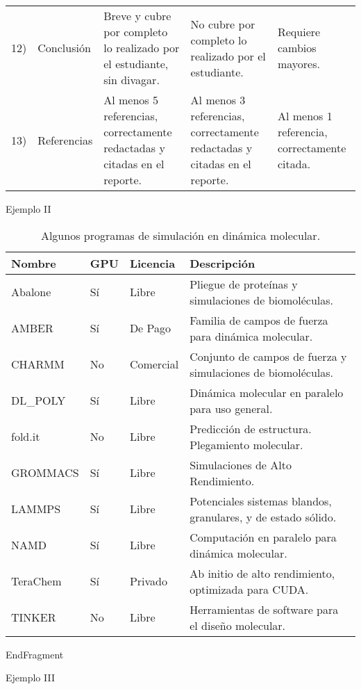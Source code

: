 \begin{table}[H]
{\begin{tabular}{rm{1.85cm}m{5cm}m{4cm}m{3.6cm}}
		12)   & Conclusión & Breve y cubre por completo lo realizado por el estudiante, sin divagar. & No cubre por completo lo realizado por el estudiante. & Requiere cambios mayores. \\ \cline{3-5}
		13)   & Referencias & Al menos 5 referencias, correctamente redactadas y citadas en el reporte. & Al menos 3 referencias, correctamente redactadas y citadas en el reporte.  & Al menos 1 referencia, correctamente citada.  \\ \cline{3-5}
		\hline
		\end{tabular}
	}
	\label{tab:Rubrica}
\end{table}

Ejemplo II

\begin{table}[H]\centering
  \begin{tabularx}{\textwidth}{XXXm{6.0cm}}\toprule
    Nombre & GPU  & Licencia & Descripción		\\		\midrule\midrule
    Abalone & Sí & Libre & Pliegue de proteínas y simulaciones de biomoléculas. \\
    AMBER & Sí & De Pago & Familia de campos de fuerza para dinámica molecular. \\
    CHARMM & No & Comercial & Conjunto de campos de fuerza y simulaciones de biomoléculas. \\
    DL\_POLY & Sí & Libre & Dinámica molecular en paralelo para uso general. \\
    fold.it & No & Libre & Predicción de estructura. Plegamiento molecular. \\
    GROMMACS & Sí & Libre & Simulaciones de Alto Rendimiento. \\ 
    LAMMPS & Sí & Libre & Potenciales sistemas blandos, granulares, y de estado sólido. \\
    NAMD & Sí & Libre & Computación en paralelo para dinámica molecular. \\
    TeraChem & Sí & Privado & Ab initio de alto rendimiento, optimizada para CUDA. \\
    TINKER & No & Libre & Herramientas de software para el diseño molecular. \\		\bottomrule
  \end{tabularx}
  \caption{Algunos programas de simulación en dinámica molecular.}\label{tab:ProgramasDM}
\end{table}EndFragment

Ejemplo III

